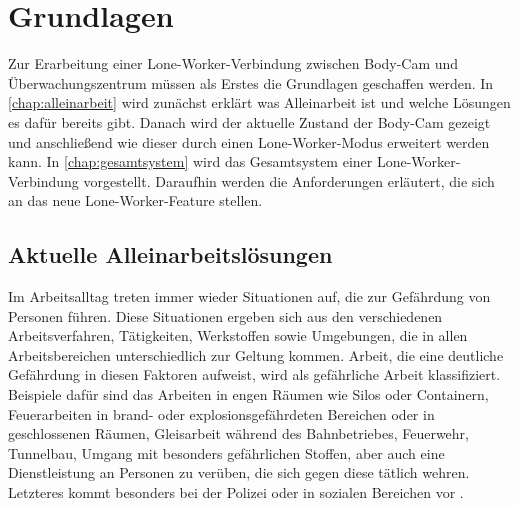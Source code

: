 \documentclass[thesis.tex]{subfiles}
\begin{document}
\chapter{Grundlagen}\label{chap:grundlagen}

Zur Erarbeitung einer Lone-Worker-Verbindung zwischen Body-Cam und Überwachungszentrum müssen als Erstes die Grundlagen geschaffen werden.
In \autoref{chap:alleinarbeit} wird zunächst erklärt was Alleinarbeit ist und welche Lösungen es dafür bereits gibt.
Danach wird der aktuelle Zustand der Body-Cam gezeigt und anschließend wie dieser durch einen Lone-Worker-Modus erweitert werden kann.
In \autoref{chap:gesamtsystem} wird das Gesamtsystem einer Lone-Worker-Verbindung vorgestellt.
Daraufhin werden die Anforderungen erläutert, die sich an das neue Lone-Worker-Feature stellen.

\section{Aktuelle Alleinarbeitslösungen}\label{chap:alleinarbeit}

Im Arbeitsalltag treten immer wieder Situationen auf, die zur Gefährdung von Personen führen.
Diese Situationen ergeben sich aus den verschiedenen Arbeitsverfahren, Tätigkeiten, Werkstoffen sowie Umgebungen, die in allen Arbeitsbereichen unterschiedlich zur Geltung kommen.
Arbeit, die eine deutliche Gefährdung in diesen Faktoren aufweist, wird als gefährliche Arbeit klassifiziert.
Beispiele dafür sind das Arbeiten in engen Räumen wie Silos oder Containern, Feuerarbeiten in brand- oder explosionsgefährdeten Bereichen oder in geschlossenen Räumen, Gleisarbeit während des Bahnbetriebes, Feuerwehr, Tunnelbau, Umgang mit besonders gefährlichen Stoffen, aber auch eine Dienstleistung an Personen zu verüben, die sich gegen diese tätlich wehren.
Letzteres kommt besonders bei der Polizei oder in sozialen Bereichen vor \cite[vgl.~S.~41 2.7.1][]{Regel_100-001}.
\end{document}
